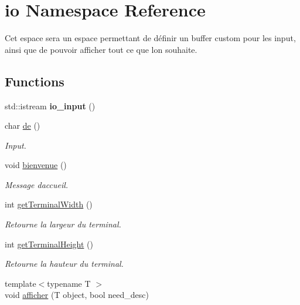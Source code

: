 \hypertarget{namespaceio}{}\section{io Namespace Reference}
\label{namespaceio}


Cet espace sera un espace permettant de définir un buffer custom pour les input, ainsi que de pouvoir afficher tout ce que l\textquotesingle{}on souhaite.  


\subsection*{Functions}
\begin{DoxyCompactItemize}
\item 
\mbox{\label{namespaceio_aa3dbf94851f627ae6201efa77e77198c}} 
std\+::istream {\bfseries io\+\_\+input} ()
\item 
char \hyperlink{namespaceio_ae9908b55f26f07e78043d7cfad003d22}{de} ()
\begin{DoxyCompactList}\small\item\em Input. \end{DoxyCompactList}\item 
void \hyperlink{namespaceio_a7fdf85a0d766d2dcdb9870ae0458826a}{bienvenue} ()
\begin{DoxyCompactList}\small\item\em Message d\textquotesingle{}accueil. \end{DoxyCompactList}\item 
\mbox{\label{namespaceio_a71636a15a219ee1dcc177e9749cf20bc}} 
int \hyperlink{namespaceio_a71636a15a219ee1dcc177e9749cf20bc}{get\+Terminal\+Width} ()
\begin{DoxyCompactList}\small\item\em Retourne la largeur du terminal. \end{DoxyCompactList}\item 
\mbox{\label{namespaceio_ab7da8a98a7b636d1d5f0f6eb820f1f81}} 
int \hyperlink{namespaceio_ab7da8a98a7b636d1d5f0f6eb820f1f81}{get\+Terminal\+Height} ()
\begin{DoxyCompactList}\small\item\em Retourne la hauteur du terminal. \end{DoxyCompactList}\item 
{\footnotesize template$<$typename T $>$ }\\void \hyperlink{namespaceio_a0e3593d732c42572e8b3cb09ad21c4c9}{afficher} (T object, bool need\+\_\+desc)

\end{DoxyCompactItemize}
